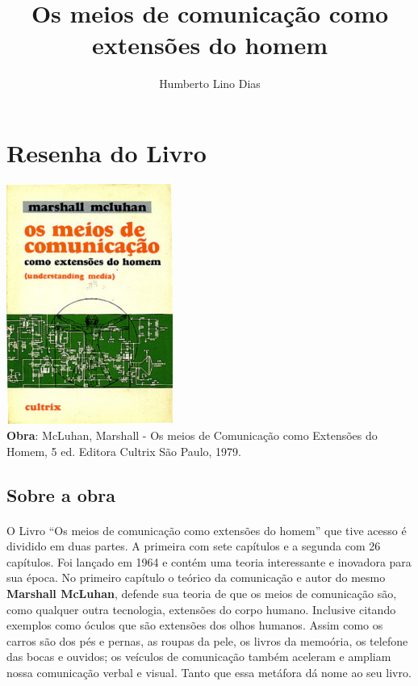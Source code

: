\documentclass[12pt,a4paper]{article}
\title{Os meios de comunicação como extensões do homem}
\author{Humberto Lino Dias}
\begin{document}
\maketitle
{}
\singlespacing
 
 
\section{Resenha do Livro}

\begin{center}

\includegraphics[height=3.1in]{book_cover.eps} \\ [1em]
\textbf{Obra}: McLuhan, Marshall - Os meios de Comunicação como Extensões do Homem, 5 ed. Editora Cultrix São Paulo, 1979. \cite{understanding_media}

\end{center}

 
\subsection{Sobre a obra}
 
\paragraph{}
O Livro ``Os meios de comunicação como extensões do homem''\cite{understanding_media} que tive acesso é dividido em duas partes. A primeira com sete capítulos e a segunda com 26 capítulos. Foi lançado em 1964 e contém uma teoria interessante e inovadora para sua época. No primeiro capítulo o teórico da comunicação e autor do mesmo \textbf{Marshall McLuhan}\cite{wiki:marshall_mcluhan}, defende sua teoria de que os meios de comunicação são, como qualquer outra tecnologia, extensões do corpo humano.
Inclusive citando exemplos como óculos que são extensões dos olhos humanos. Assim como os carros são dos pés e pernas, as roupas da pele, os livros da memoória, os telefone das bocas e ouvidos; os veículos de comunicação também aceleram e ampliam nossa comunicação verbal e visual. Tanto que essa metáfora dá nome ao seu livro.
\end{document}
